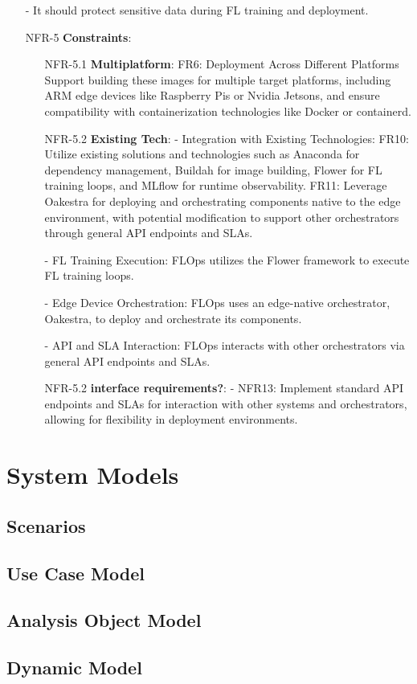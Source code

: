 \begin{itemize}
        - It should protect sensitive data during FL training and deployment.
    \item [NFR-5] {\textbf{Constraints}}: %
        \begin{itemize}
            \item [NFR-5.1] {\textbf{Multiplatform}}:
                FR6: Deployment Across Different Platforms
                Support building these images for multiple target platforms, including ARM edge devices like Raspberry Pis or Nvidia Jetsons,
                and ensure compatibility with containerization technologies like Docker or containerd.
            \item [NFR-5.2] {\textbf{Existing Tech}}: %
                - Integration with Existing Technologies:
                    FR10: Utilize existing solutions and technologies such as Anaconda for dependency management, Buildah for image building, Flower for FL training loops, and MLflow for runtime observability.
                    FR11: Leverage Oakestra for deploying and orchestrating components native to the edge environment, with potential modification to support other orchestrators through general API endpoints and SLAs.

                - FL Training Execution:
                    FLOps utilizes the Flower framework to execute FL training loops.

                - Edge Device Orchestration:
                    FLOps uses an edge-native orchestrator, Oakestra, to deploy and orchestrate its components.

                - API and SLA Interaction:
                    FLOps interacts with other orchestrators via general API endpoints and SLAs.
            \item [NFR-5.2] {\textbf{interface requirements?}}:
                - NFR13: Implement standard API endpoints and SLAs for interaction with other systems and orchestrators, allowing for flexibility in deployment environments.
        \end{itemize}
\end{itemize}




\section{System Models}
\subsection{Scenarios}
\subsection{Use Case Model}
\subsection{Analysis Object Model}
\subsection{Dynamic Model}
